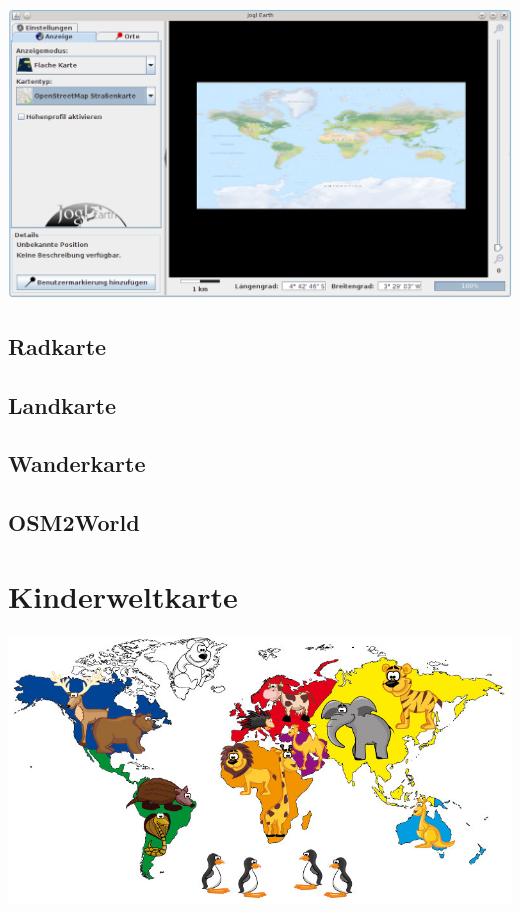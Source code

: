 \documentclass[10pt]{scrreprt}
\begin{document}
\vspace{3mm}
\begin{center}
\includegraphics[scale=0.3]{images/flacheKarte_Strassenkarte.png}
\end{center}

\subsection{Radkarte} 
\subsection{Landkarte}
\subsection{Wanderkarte}
\subsection{OSM2World} 



\vspace{3mm}
\section{Kinderweltkarte} 

\vspace{3mm}
\begin{center}
\includegraphics[scale=0.3]{images/Kinder-Weltkarte.jpg}
\end{center}
\end{document}
